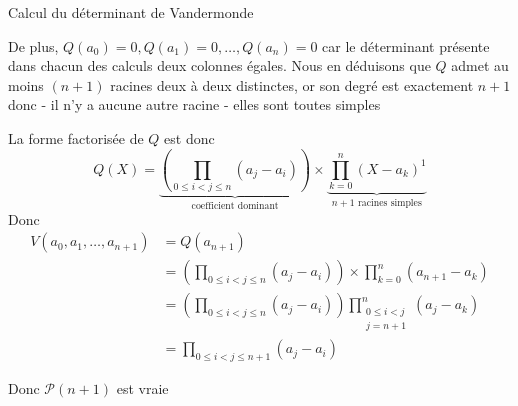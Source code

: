 \documentclass{article}
\begin{document}
\begin{question_kholle}{Calcul du déterminant de Vandermonde}
\begin{itemize}[label=$\lozenge$]
\begin{itemize}
De plus, $Q(a_{0})=0, Q(a_{1})=0, \dots, Q(a_{n})=0$ car le déterminant présente dans chacun des calculs deux colonnes égales. Nous en déduisons que $Q$ admet au moins $(n+1)$ racines deux à deux distinctes, or son degré est exactement $n+1$ donc
- il n'y a aucune autre racine
- elles sont toutes simples

La forme factorisée de $Q$ est donc
$$
Q(X)=\underbrace{ \left( \prod_{0\leqslant i < j \leqslant n} (a_{j}-a_{i})\right) }_{ \text{coefficient dominant} } \times \underbrace{ \prod_{k=0}^{n}(X-a_{k})^{1} }_{ n+1 \text{ racines simples} }
$$
Donc 
\begin{align*}
V(a_{0}, a_{1},\dots, a_{n+1})&=Q(a_{n+1}) \\
&=  \left( \prod_{0\leqslant i < j \leqslant n} (a_{j}-a_{i})\right) \times  \prod_{k=0}^{n}(a_{n+1}-a_{k})  \\
&= \left( \prod_{0\leqslant i < j \leqslant n} (a_{j}-a_{i})\right) \prod_{\substack{0\leqslant i<j \\ j=n+1}}^{n}(a_{j}-a_{k}) \\
&= \prod_{0\leqslant i < j \leqslant n+1} (a_{j}-a_{i})
\end{align*}

Donc $\mathcal{P}(n+1)$ est vraie
\end{itemize}
\end{itemize}
\end{question_kholle}
\end{document}
